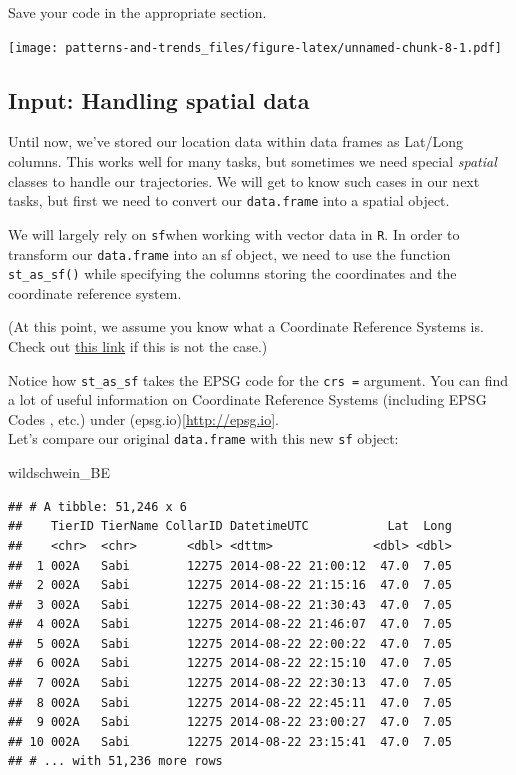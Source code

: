 \documentclass[
]{book}
\newenvironment{Shaded}{\begin{snugshade}}{\end{snugshade}}
\newcommand{\NormalTok}[1]{#1}
\begin{document}
Save your code in the appropriate section.

\texttt{[image: patterns-and-trends\_files/figure-latex/unnamed-chunk-8-1.pdf]}

\hypertarget{input-handling-spatial-data}{%
\subsection{Input: Handling spatial data}\label{input-handling-spatial-data}}

Until now, we've stored our location data within data frames as Lat/Long columns. This works well for many tasks, but sometimes we need special \emph{spatial} classes to handle our trajectories. We will get to know such cases in our next tasks, but first we need to convert our \texttt{data.frame} into a spatial object.

We will largely rely on \texttt{sf}when working with vector data in \texttt{R}. In order to transform our \texttt{data.frame} into an sf object, we need to use the function \texttt{st\_as\_sf()} while specifying the columns storing the coordinates and the coordinate reference system.

(At this point, we assume you know what a Coordinate Reference Systems is. Check out \href{https://earthdatascience.org/courses/earth-analytics/spatial-data-r/intro-to-coordinate-reference-systems/}{this link} if this is not the case.)

Notice how \texttt{st\_as\_sf} takes the EPSG code for the \texttt{crs\ =} argument. You can find a lot of useful information on Coordinate Reference Systems (including EPSG Codes , etc.) under (epsg.io){[}\url{http://epsg.io}{]}.\\
Let's compare our original \texttt{data.frame} with this new \texttt{sf} object:

\begin{Shaded}
\begin{Highlighting}[]
\NormalTok{wildschwein\_BE}
\end{Highlighting}
\end{Shaded}

\begin{verbatim}
## # A tibble: 51,246 x 6
##    TierID TierName CollarID DatetimeUTC           Lat  Long
##    <chr>  <chr>       <dbl> <dttm>              <dbl> <dbl>
##  1 002A   Sabi        12275 2014-08-22 21:00:12  47.0  7.05
##  2 002A   Sabi        12275 2014-08-22 21:15:16  47.0  7.05
##  3 002A   Sabi        12275 2014-08-22 21:30:43  47.0  7.05
##  4 002A   Sabi        12275 2014-08-22 21:46:07  47.0  7.05
##  5 002A   Sabi        12275 2014-08-22 22:00:22  47.0  7.05
##  6 002A   Sabi        12275 2014-08-22 22:15:10  47.0  7.05
##  7 002A   Sabi        12275 2014-08-22 22:30:13  47.0  7.05
##  8 002A   Sabi        12275 2014-08-22 22:45:11  47.0  7.05
##  9 002A   Sabi        12275 2014-08-22 23:00:27  47.0  7.05
## 10 002A   Sabi        12275 2014-08-22 23:15:41  47.0  7.05
## # ... with 51,236 more rows
\end{verbatim}
\end{document}
